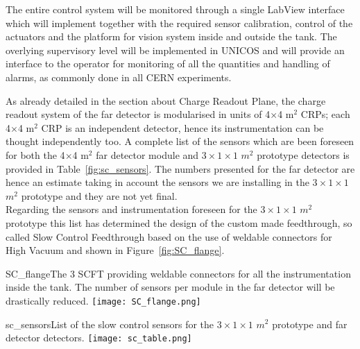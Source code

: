  The entire control system will be monitored through a single LabView  interface which will implement together with the required sensor
 calibration, control of the actuators and the platform for vision  system inside and outside the tank. The overlying supervisory level
 will be implemented in UNICOS and will provide an interface to the  operator for monitoring of all the quantities and handling of alarms,
 as commonly done in all CERN experiments.  

As already detailed in the section about Charge Readout Plane, the charge readout system of the far detector is modularised in units of 4$\times$4 m$^2$ CRPs; each 4$\times$4 m$^2$ CRP is an independent detector, hence its instrumentation can be thought independently too. A complete list of the sensors which are been foreseen for both the 4$\times$4 m$^2$ far detector module and $3 \times 1 \times 1$ $m^2$ prototype detectors is provided in Table~\ref{fig:sc_sensors}.  The numbers presented for the far detector are hence an estimate taking in account the sensors we are installing in the $3 \times 1 \times 1$ $m^2$ prototype and they are not yet final.
\\ Regarding the sensors and instrumentation foreseen for the $3 \times 1 \times 1$ $m^2$ prototype this list has determined the design of the custom made feedthrough, so called Slow Control Feedthrough based on the use of weldable connectors for High Vacuum and shown in Figure~\ref{fig:SC_flange}.

\begin{cdrfigure}{SC_flange}{The 3 SCFT providing weldable connectors for all the instrumentation inside the tank. The number of sensors per module in the far detector will be drastically reduced.}
   \texttt{[image: SC\_flange.png]}
 \end{cdrfigure}

\begin{cdrfigure}{sc_sensors}{List of the slow control sensors for the $3 \times 1 \times 1$ $m^2$ prototype and far detector detectors.}
 \texttt{[image: sc\_table.png]} %
 \end{cdrfigure}
   
